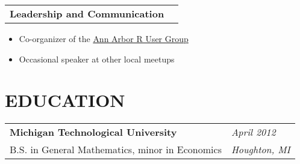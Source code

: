 \documentclass[margin,line]{res}
\begin{document}
\begin{resume}
\begin{tabular}{p{4.4in} l}
  {\bf Leadership and Communication}
\end{tabular}
\vspace{2pt}
\begin{itemize} \itemsep -2pt
  \item Co-organizer of the \href{https://annarborrusergroup.github.io/}{Ann Arbor R User Group}
  \item Occasional speaker at other local meetups
\end{itemize}

\vspace{3pt}


\section{EDUCATION}

\begin{tabular}{p{4.4in} l}
  {\bf Michigan Technological University} & \emph{April 2012} \\
  B.S. in General Mathematics, minor in Economics & \emph{Houghton, MI} \\
\end{tabular}


\end{resume}
\end{document}
